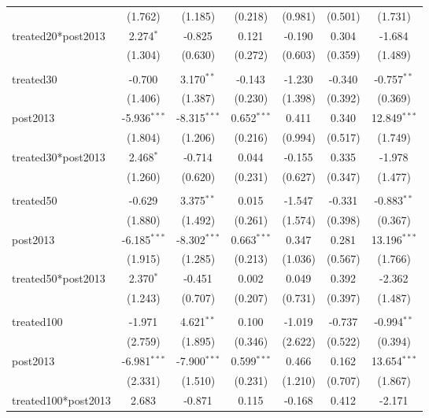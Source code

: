 \documentclass[12pt]{article}
\begin{document}
\begin{table}[!htbp]
\begin{tabular}{@{\extracolsep{5pt}}lcccccc}
  & (1.762) & (1.185) & (0.218) & (0.981) & (0.501) & (1.731) \\
 treated20*post2013 & 2.274$^{*}$ & -0.825$^{}$ & 0.121$^{}$ & -0.190$^{}$ & 0.304$^{}$ & -1.684$^{}$ \\
  & (1.304) & (0.630) & (0.272) & (0.603) & (0.359) & (1.489) \\
\hline \\[-1.8ex]
 treated30 & -0.700$^{}$ & 3.170$^{**}$ & -0.143$^{}$ & -1.230$^{}$ & -0.340$^{}$ & -0.757$^{**}$ \\
  & (1.406) & (1.387) & (0.230) & (1.398) & (0.392) & (0.369) \\
 post2013 & -5.936$^{***}$ & -8.315$^{***}$ & 0.652$^{***}$ & 0.411$^{}$ & 0.340$^{}$ & 12.849$^{***}$ \\
  & (1.804) & (1.206) & (0.216) & (0.994) & (0.517) & (1.749) \\
 treated30*post2013 & 2.468$^{*}$ & -0.714$^{}$ & 0.044$^{}$ & -0.155$^{}$ & 0.335$^{}$ & -1.978$^{}$ \\
  & (1.260) & (0.620) & (0.231) & (0.627) & (0.347) & (1.477) \\
\hline \\[-1.8ex]
 treated50 & -0.629$^{}$ & 3.375$^{**}$ & 0.015$^{}$ & -1.547$^{}$ & -0.331$^{}$ & -0.883$^{**}$ \\
  & (1.880) & (1.492) & (0.261) & (1.574) & (0.398) & (0.367) \\
 post2013 & -6.185$^{***}$ & -8.302$^{***}$ & 0.663$^{***}$ & 0.347$^{}$ & 0.281$^{}$ & 13.196$^{***}$ \\
  & (1.915) & (1.285) & (0.213) & (1.036) & (0.567) & (1.766) \\
 treated50*post2013 & 2.370$^{*}$ & -0.451$^{}$ & 0.002$^{}$ & 0.049$^{}$ & 0.392$^{}$ & -2.362$^{}$ \\
  & (1.243) & (0.707) & (0.207) & (0.731) & (0.397) & (1.487) \\
\hline \\[-1.8ex]
 treated100 & -1.971$^{}$ & 4.621$^{**}$ & 0.100$^{}$ & -1.019$^{}$ & -0.737$^{}$ & -0.994$^{**}$ \\
  & (2.759) & (1.895) & (0.346) & (2.622) & (0.522) & (0.394) \\
 post2013 & -6.981$^{***}$ & -7.900$^{***}$ & 0.599$^{***}$ & 0.466$^{}$ & 0.162$^{}$ & 13.654$^{***}$ \\
  & (2.331) & (1.510) & (0.231) & (1.210) & (0.707) & (1.867) \\
 treated100*post2013 & 2.683$^{}$ & -0.871$^{}$ & 0.115$^{}$ & -0.168$^{}$ & 0.412$^{}$ & -2.171$^{}$ \\

\end{tabular}
\end{table}
\end{document}
